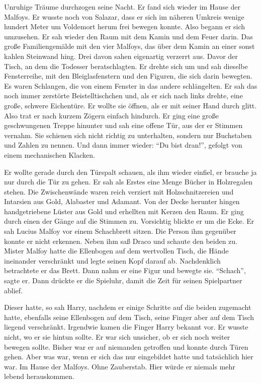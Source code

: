 Unruhige Träume durchzogen seine Nacht. Er fand sich wieder im Hause der Malfoys. Er wusste noch von Salazar, dass er sich im näheren Umkreis \gst wenige hundert Meter \gst um Voldemort herum frei bewegen konnte. Also begann er sich umzusehen. Er sah wieder den Raum mit dem Kamin und dem Feuer darin. Das große Familiengemälde mit den vier Malfoys, das über dem Kamin an einer sonst kahlen Steinwand hing. Drei davon sahen eigenartig verzerrt aus. Davor der Tisch, an dem die Todesser beratschlagten. Er drehte sich um und sah dieselbe Fensterreihe, mit den Bleiglasfenstern und den Figuren, die sich darin bewegten. Es waren Schlangen, die von einem Fenster in das andere schlängelten. Er sah das noch immer zerstörte Beistelltischchen und, als er sich nach links drehte, eine große, schwere Eichentüre. Er wollte sie öffnen, als er mit seiner Hand durch glitt. Also trat er nach kurzem Zögern einfach hindurch. Er ging eine große geschwungenen Treppe hinunter und sah eine offene Tür, aus der er Stimmen vernahm. Sie schienen sich nicht richtig zu unterhalten, sondern nur Buchstaben und Zahlen zu nennen. Und dann immer wieder: \enquote{Du bist dran!}, gefolgt von einem mechanischen Klacken.

Er wollte gerade durch den Türspalt schauen, als ihm wieder einfiel, er brauche ja nur durch die Tür zu gehen. Er sah als Erstes eine Menge Bücher in Holzregalen stehen. Die Zwischenwände waren reich verziert mit Holzschnitzereien und Intarsien aus Gold, Alabaster und Adamant. Von der Decke herunter hingen handgetriebene Lüster aus Gold und erhellten mit Kerzen den Raum. Er ging durch einen der Gänge auf die Stimmen zu. Vorsichtig blickte er um die Ecke. Er sah Lucius Malfoy vor einem Schachbrett sitzen. Die Person ihm gegenüber konnte er nicht erkennen. Neben ihm saß Draco und schaute den beiden zu. Mister Malfoy hatte die Ellenbogen auf dem wertvollen Tisch, die Hände ineinander verschränkt und legte seinen Kopf darauf ab. Nachdenklich betrachtete er das Brett. Dann nahm er eine Figur und bewegte sie. \enquote{Schach}, sagte er. Dann drückte er die Spieluhr, damit die Zeit für seinen Spielpartner ablief.

Dieser hatte, so sah Harry, nachdem er einige Schritte auf die beiden zugemacht hatte, ebenfalls seine Ellenbogen auf dem Tisch, seine Finger aber auf dem Tisch liegend verschränkt. Irgendwie kamen die Finger Harry bekannt vor. Er wusste nicht, wo er sie hintun sollte. Er war sich unsicher, ob er sich noch weiter bewegen sollte. Bisher war er auf niemanden getroffen und konnte durch Türen gehen. Aber was war, wenn er sich das nur eingebildet hatte und tatsächlich hier war. Im Hause der Malfoys. Ohne Zauberstab. Hier würde er niemals mehr lebend herauskommen.

